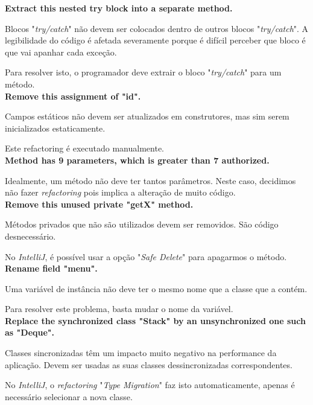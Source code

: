 \documentclass[a4paper]{report}
\begin{document}
\begin{itemize}
    \textbf{Extract this nested try block into a separate method.}
    
    Blocos "\textit{try/catch}" não devem ser colocados dentro de outros blocos "\textit{try/catch}". A legibilidade do código é afetada severamente porque é difícil perceber que bloco é que vai apanhar cada exceção.
    
    Para resolver isto, o programador deve extrair o bloco "\textit{try/catch}" para um método.\\
    
    \textbf{Remove this assignment of "id".}
    
    Campos estáticos não devem ser atualizados em construtores, mas sim serem inicializados estaticamente.
    
    Este refactoring é executado manualmente.\\
    
    \textbf{Method has 9 parameters, which is greater than 7 authorized.}
    
    Idealmente, um método não deve ter tantos parâmetros.
    Neste caso, decidimos não fazer \textit{refactoring} pois implica a alteração de muito código.\\
    
    \textbf{Remove this unused private "getX" method.}
    
    Métodos privados que não são utilizados devem ser removidos. São código desnecessário.
    
    No \textit{IntelliJ}, é possível usar a opção "\textit{Safe Delete}" para apagarmos o método.\\
    
    \textbf{Rename field "menu".}
    
    Uma variável de instância não deve ter o mesmo nome que a classe que a contém.
    
    Para resolver este problema, basta mudar o nome da variável.\\
    
    \textbf{Replace the synchronized class "Stack" by an unsynchronized one such as "Deque".}
    
    Classes sincronizadas têm um impacto muito negativo na performance da aplicação. Devem ser usadas as suas classes dessincronizadas correspondentes.
    
    No \textit{IntelliJ}, o \textit{refactoring} "\textit{Type Migration}" faz isto automaticamente, apenas é necessário selecionar a nova classe.\\
    

\end{itemize}
\end{document}
